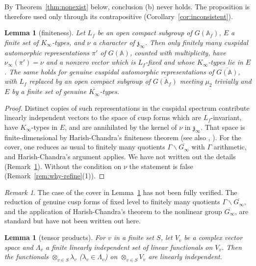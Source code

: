 \documentclass[12pt,letterpaper,openany]{book}
\theoremstyle{plain}
\newtheorem{lemma}[theorem]{Lemma}
\theoremstyle{definition}
\theoremstyle{remark}
\theoremstyle{remark}
\newtheorem{remyy}{Remark}
\begin{document}
By Theorem~\ref{thm:nonexist} below, conclusion (b) never holds. The
proposition is therefore used only through its contrapositive
(Corollary~\ref{cor:inconsistent}).

\begin{lemma}[finiteness]\label{lem:finiteness}
Let $L_f$ be an open compact subgroup of $G({\mathbb{A}}_f)$, $E$ a
finite set of $K_\infty$-types, and $\nu$ a character of
$\mathfrak z_\infty$. Then only finitely many cuspidal
automorphic representations $\pi'$ of $G({\mathbb{A}})$, counted with
multiplicity, have $\nu_\infty(\pi')=\nu$ and a nonzero vector which is
$L_f$-fixed and whose $K_\infty$-types lie in $E$. The same holds for
genuine cuspidal automorphic representations of
$\overline{G({\mathbb{A}})}$, with $L_f$ replaced by an open compact
subgroup of $\overline{G({\mathbb{A}}_f)}$ meeting $\mu_2$ trivially and
$E$ by a finite set of genuine $\overline{K_\infty}$-types.
\end{lemma}

\begin{proof}
Distinct copies of such representations in the cuspidal spectrum
contribute linearly independent vectors to the space of cusp forms which
are $L_f$-invariant, have $K_\infty$-types in $E$, and are annihilated by
the kernel of $\nu$ in $\mathfrak z_\infty$. That space is
finite-dimensional by Harish-Chandra's finiteness theorem \cite{HC68}
(see also \cite{BJ}, \cite{MW}). For the cover, one reduces as usual to
finitely many quotients $\Gamma\backslash\overline{G_\infty}$ with
$\Gamma$ arithmetic, and Harish-Chandra's argument applies. We have not
written out the details (Remark~\ref{rem26:finiteness-cover}). Without the
condition on $\nu$ the statement is false (Remark~\ref{rem:why-refine}(1)).
\end{proof}

\begin{remyy}\label{rem26:finiteness-cover}
The case of the cover in Lemma~\ref{lem:finiteness} has not been fully
verified. The reduction of genuine cusp forms of fixed level to finitely
many quotients $\Gamma\backslash\overline{G_\infty}$, and the application of
Harish-Chandra's theorem to the nonlinear group $\overline{G_\infty}$, are
standard but have not been written out here.
\end{remyy}

\begin{lemma}[tensor products]\label{lem:tensor}
For $v$ in a finite set $S$, let $V_v$ be a complex vector space and
$\Lambda_v$ a finite linearly independent set of linear functionals on
$V_v$. Then the functionals $\otimes_{v\in S}\lambda_v$
($\lambda_v\in\Lambda_v$) on $\otimes_{v\in S}V_v$ are linearly
independent.
\end{lemma}
\end{document}
